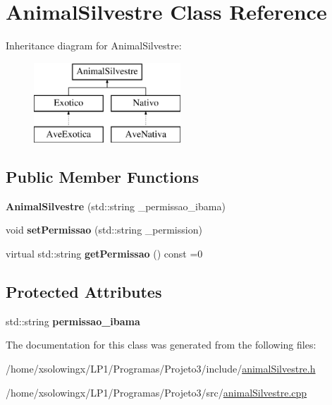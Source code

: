 \hypertarget{classAnimalSilvestre}{}\section{Animal\+Silvestre Class Reference}
\label{classAnimalSilvestre}
Inheritance diagram for Animal\+Silvestre\+:\begin{figure}[H]
\begin{center}
\leavevmode
\includegraphics[height=3.000000cm]{classAnimalSilvestre}
\end{center}
\end{figure}
\subsection*{Public Member Functions}
\begin{DoxyCompactItemize}
\item 
\mbox{\label{classAnimalSilvestre_ab2d89bd466c5dfa210fd8777c8f67f2c}} 
{\bfseries Animal\+Silvestre} (std\+::string \+\_\+permissao\+\_\+ibama)
\item 
\mbox{\label{classAnimalSilvestre_a9cf5ef01a13af94712ec39916edd09ea}} 
void {\bfseries set\+Permissao} (std\+::string \+\_\+permission)
\item 
\mbox{\label{classAnimalSilvestre_a99b340ebe3717d03b31455c565afd5ad}} 
virtual std\+::string {\bfseries get\+Permissao} () const =0
\end{DoxyCompactItemize}
\subsection*{Protected Attributes}
\begin{DoxyCompactItemize}
\item 
\mbox{\label{classAnimalSilvestre_afe5c61c862f252fadbb2c9779ed67592}} 
std\+::string {\bfseries permissao\+\_\+ibama}
\end{DoxyCompactItemize}


The documentation for this class was generated from the following files\+:\begin{DoxyCompactItemize}
\item 
/home/xsolowingx/\+L\+P1/\+Programas/\+Projeto3/include/\hyperlink{animalSilvestre_8h}{animal\+Silvestre.\+h}\item 
/home/xsolowingx/\+L\+P1/\+Programas/\+Projeto3/src/\hyperlink{animalSilvestre_8cpp}{animal\+Silvestre.\+cpp}\end{DoxyCompactItemize}
